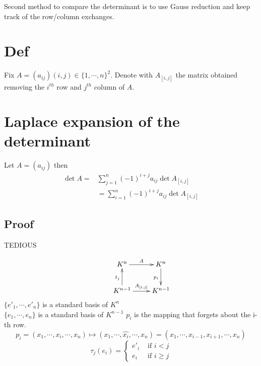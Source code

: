 \documentclass{book}
\begin{document}
Second method to compare the determinant is to use Gauss reduction and keep track of the row/column exchanges.
\section{Def}
Fix $A=(a_{ij}) (i,j)\in \{1,\cdots,n\}^2$. Denote with $A_{[i,j]}$ the matrix obtained removing the $i^{th}$ row and $j^{th}$ column of $A$. 
\section{Laplace expansion of the determinant}
Let $A=(a_{ij})$ then 
$$
\begin{aligned}
    \det A=&\sum\limits_{j=1}^n(-1)^{i+j}a_{ij}\det A_{[i,j]}\\
    &=\sum\limits_{i=1}^n(-1)^{i+j}a_{ij}\det A_{[i,j]}
\end{aligned}
$$
\subsection*{Proof}TEDIOUS

$$\xymatrix{
    &K^n\ar[r]^A &K^n\ar[d]_{p_i}\\
    & K^{n-1}\ar[u]^{t_j}\ar[r]^{A_{[i,j]}} &K^{n-1}
}$$
$\{e'_1,\cdots,e'_n\}$ is a standard basis of $K^n$
\\$\{e_1,\cdots,e_n\}$ is a standard basis of $K^{n-1}$
$p_i$ is the mapping that forgets about the i-th row.
$$p_i=(x_1,\cdots,x_i,\cdots,x_n)\mapsto(x_1,\cdots,\widehat{x_i},\cdots,x_n)=(x_1,\cdots,x_{i-1},x_{i+1},\cdots,x_n)$$
$$\tau_j(e_i)=\left\{\begin{aligned}e'_i &\text{ if } i<j\\ e_i &\text{ if } i\geq j\end{aligned}\right.$$
\end{document}
